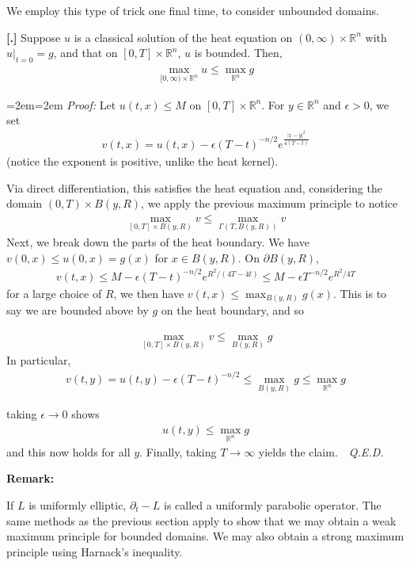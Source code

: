 \documentclass{article}
\newcommand{\R}{{\mathbb{R}}}
\newcommand{\pd}{\partial}
\newcounter{result}[section]
\newenvironment{res}[1][]{\refstepcounter{result}\par\medskip
	\noindent \textbf{[\thesection.\theresult] #1} \rmfamily}{\medskip}
\newenvironment{pf}{%
	\par%
	\medskip
	\leftskip=2em\rightskip=2em%
	\noindent\ignorespaces \textit{Proof:} \newline}{%
	\,\, \newline \textit{Q.E.D.}\par\medskip}
\begin{document}
	We employ this type of trick one final time, to consider unbounded domains. 
	\begin{res}
		Suppose $u$ is a classical solution of the heat equation on $(0,\infty) \times \R^{n}$ with $u|_{t=0} = g$, and that on $[0,T] \times \R^{n}$, $u$ is bounded. Then,
		\begin{align*}
			\max_{[0,\infty) \times \R^{n}} u \leq \max_{\R^{n}} g
		\end{align*}
	\end{res}
	\begin{pf}
		Let $u(t,x) \leq M$ on $[0,T] \times \R^{n}$. For $y \in \R^{n}$ and $\epsilon > 0$, we set 
		\begin{align*}
			v(t,x) = u(t,x) - \epsilon(T-t)^{-n/2}e^{\frac{|x-y|^{2}}{4(T-t)}}
		\end{align*}
		(notice the exponent is positive, unlike the heat kernel).
		
		Via direct differentiation, this satisfies the heat equation and, considering the domain $(0,T) \times B(y,R)$, we apply the previous maximum principle to notice 
		\begin{align*}
			\max_{[0,T] \times B(y,R)} v \leq \max_{\Gamma(T,B(y,R))} v 
		\end{align*}
		Next, we break down the parts of the heat boundary. We have $v(0,x) \leq u(0,x) =  g(x)$ for $x \in  B(y,R)$. On $\pd B(y,R)$,
		\begin{align*}
			v(t,x) \leq M - \epsilon(T-t)^{-n/2}e^{R^{2}/(4T-4t)}\leq M - \epsilon T^{-n/2}e^{R^{2}/4T}
		\end{align*}
		for a large choice of $R$, we then have $v(t,x) \leq \max_{ B(y,R)} g(x)$. This is to say we are bounded above by $g$ on the heat boundary, and so 
		
		\begin{align*}
			\max_{[0,T] \times B(y,R)} v \leq \max_{ B(y,R)} g 
		\end{align*}
		In particular, 
		\begin{align*}
			v(t,y) = u(t,y) - \epsilon (T-t)^{-n/2} \leq \max_{ B(y,R)} g\leq \max_{\R^{n}}g
		\end{align*}
		
		taking $\epsilon \to 0$ shows 
		\begin{align*}
			u(t,y) \leq \max_{ \R^{n} } g 
		\end{align*}
		and this now holds for all $y$. Finally, taking $T \to \infty$ yields the claim. 
	\end{pf}
	
	\textbf{Remark:}
	
	If $L$ is uniformly elliptic, $\pd_{t} - L$ is called a uniformly parabolic operator. The same methods as the previous section apply to show that we may obtain a weak maximum principle for bounded domains. We may also obtain a strong maximum principle using Harnack's inequality. 
	
	
\end{document}
